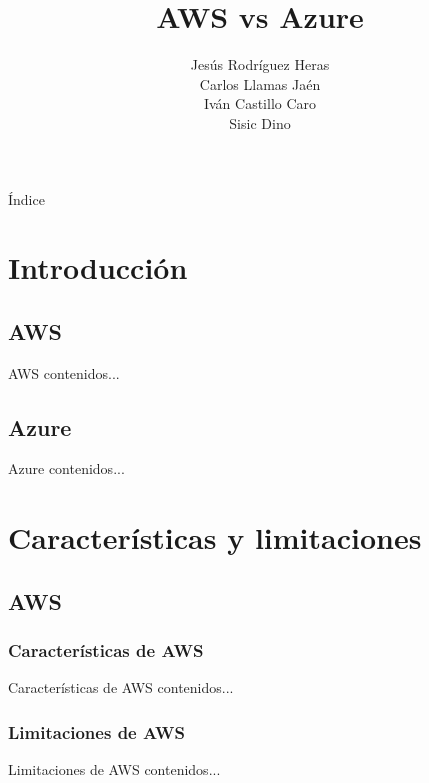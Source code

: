 \documentclass[aspectratio=1610]{beamer}
\title{AWS vs Azure}
\author{Jesús Rodríguez Heras\\
Carlos Llamas Jaén\\
Iván Castillo Caro\\
Sisic Dino}
\begin{document}
\begin{frame}
  \titlepage
  
\end{frame}

\begin{frame}{Índice}
  \tableofcontents
\end{frame}

\section{Introducción}
\subsection{AWS}
\begin{frame}{AWS}
	contenidos...
\end{frame}

\subsection{Azure}
\begin{frame}{Azure}
contenidos...
\end{frame}

\section{Características y limitaciones}
\subsection{AWS}
\subsubsection{Características de AWS}
\begin{frame}{Características de AWS}
contenidos...
\end{frame}

\subsubsection{Limitaciones de AWS}
\begin{frame}{Limitaciones de AWS}
	contenidos...
\end{frame}
\end{document}
